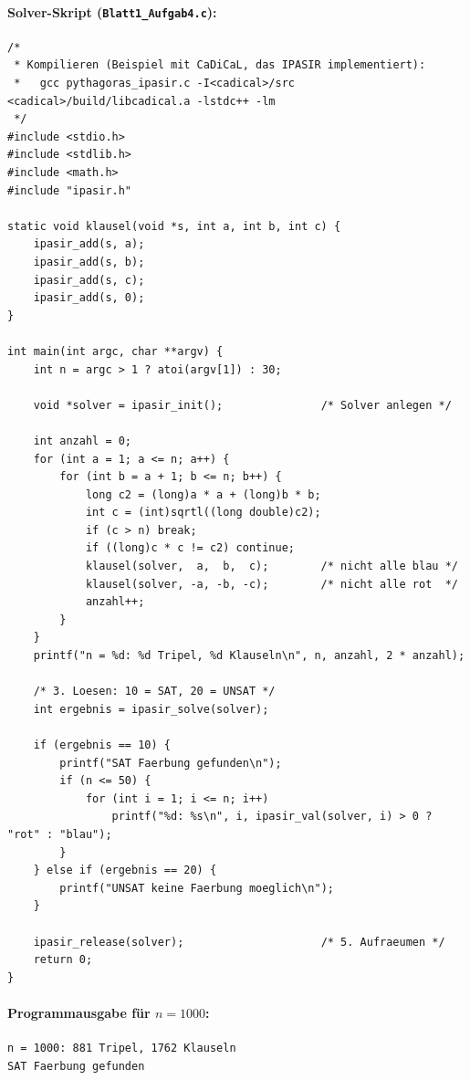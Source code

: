 \documentclass[11pt, a4paper]{article}
\begin{document}
\paragraph{Solver-Skript (\texttt{Blatt1\_Aufgab4.c}):}
\begin{lstlisting}
/*
 * Kompilieren (Beispiel mit CaDiCaL, das IPASIR implementiert):
 *   gcc pythagoras_ipasir.c -I<cadical>/src <cadical>/build/libcadical.a -lstdc++ -lm
 */
#include <stdio.h>
#include <stdlib.h>
#include <math.h>
#include "ipasir.h"

static void klausel(void *s, int a, int b, int c) {
    ipasir_add(s, a);
    ipasir_add(s, b);
    ipasir_add(s, c);
    ipasir_add(s, 0);
}

int main(int argc, char **argv) {
    int n = argc > 1 ? atoi(argv[1]) : 30;

    void *solver = ipasir_init();               /* Solver anlegen */

    int anzahl = 0;
    for (int a = 1; a <= n; a++) {
        for (int b = a + 1; b <= n; b++) {
            long c2 = (long)a * a + (long)b * b;
            int c = (int)sqrtl((long double)c2);
            if (c > n) break;
            if ((long)c * c != c2) continue;
            klausel(solver,  a,  b,  c);        /* nicht alle blau */
            klausel(solver, -a, -b, -c);        /* nicht alle rot  */
            anzahl++;
        }
    }
    printf("n = %d: %d Tripel, %d Klauseln\n", n, anzahl, 2 * anzahl);

    /* 3. Loesen: 10 = SAT, 20 = UNSAT */
    int ergebnis = ipasir_solve(solver);

    if (ergebnis == 10) {
        printf("SAT Faerbung gefunden\n");
        if (n <= 50) {
            for (int i = 1; i <= n; i++)
                printf("%d: %s\n", i, ipasir_val(solver, i) > 0 ? "rot" : "blau");
        }
    } else if (ergebnis == 20) {
        printf("UNSAT keine Faerbung moeglich\n");
    }

    ipasir_release(solver);                     /* 5. Aufraeumen */
    return 0;
}
\end{lstlisting}

\paragraph{Programmausgabe für $n = 1000$:}
\begin{verbatim}
n = 1000: 881 Tripel, 1762 Klauseln
SAT Faerbung gefunden
\end{verbatim}
\end{document}
